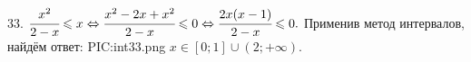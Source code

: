 33. $\cfrac{x^2}{2-x}\leqslant x \Leftrightarrow\cfrac{x^2-2x+x^2}{2-x}\leqslant 0\Leftrightarrow\cfrac{2x(x-1)}{2-x}\leqslant 0.$
Применив метод интервалов, найдём ответ:
{{PIC:int33.png}}
$x\in[0;1]\cup(2;+\infty).$\\
